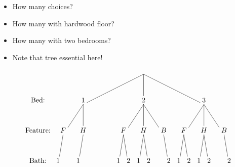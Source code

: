 \documentclass[handout]{beamer}
\theoremstyle{definition}
\begin{document}
\begin{frame}
\begin{itemize}
\item How many choices?
\item How many with hardwood floor?
\only<+->{$5$}
\item How many with two bedrooms?
\item Note that tree essential here!
\end{itemize}
\[\begin{xy}<.5cm,0cm>:
(8.5,0)="0";
(2.5,-3)="1";
(8.5,-3)="2";
(14.5,-3)="3";
"0";"1"*+!D{1}**\dir{-};
"0";"2"*+!D{2}**\dir{-};
"0";"3"*+!D{3}**\dir{-};
(.5,-6)="11";
(2.5,-6)="12";
(4.5,-6)="13";
(6.5,-6)="21";
(8.5,-6)="22";
(10.5,-6)="23";
(12.5,-6)="31";
(14.5,-6)="32";
(16.5,-6)="33";
"1";"11"*+!D{F}**\dir{-};
"1";"12"*+!D{H}**\dir{-};
"2";"21"*+!D{F}**\dir{-};
"2";"22"*+!D{H}**\dir{-};
"2";"23"*+!D{B}**\dir{-};
"3";"31"*+!D{F}**\dir{-};
"3";"32"*+!D{H}**\dir{-};
"3";"33"*+!D{B}**\dir{-};
"11";(0,-9)*+!D{1}**\dir{-};
"12";(2,-9)*+!D{1}**\dir{-};
"21";(6,-9)*+!D{1}**\dir{-};
"21";(7,-9)*+!D{2}**\dir{-};
"22";(8,-9)*+!D{1}**\dir{-};
"22";(9,-9)*+!D{2}**\dir{-};
"23";(11,-9)*+!D{2}**\dir{-};
"31";(12,-9)*+!D{1}**\dir{-};
"31";(13,-9)*+!D{2}**\dir{-};
"32";(14,-9)*+!D{1}**\dir{-};
"32";(15,-9)*+!D{2}**\dir{-};
"33";(17,-9)*+!D{2}**\dir{-};
(-2,-3)*+!D{\text{Bed:}};
(-2,-6)*+!D{\text{Feature:}};
(-2,-9)*+!D{\text{Bath:}};
\end{xy}\]
\end{frame}
\end{document}
